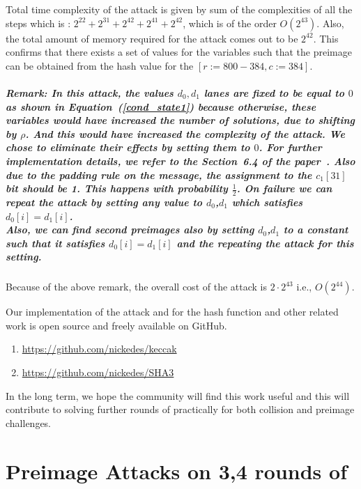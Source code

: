 Total time complexity of the attack is given by sum of the complexities of all the steps which is : $2^{22} + 2^{31} + 2^{42} + 2^{41} + 2^{42}$, which is of the order $O(2^{43})$.
Also, the total amount of memory required for the attack comes out to be $2^{42}$. 
This confirms that there exists a set of values for the variables such that the preimage can be obtained from the hash value for the \KECCAK{}$[r:=800-384, c:=384]$.


\paragraph{Remark:
In this attack, the values $d_0, d_1$ lanes are fixed to be equal to $0$ as shown in Equation~(\ref{cond_state1}) because otherwise, these variables would have increased the number of solutions, due to shifting by $\rho$. 
And this would have increased the complexity of the attack. We chose to eliminate their effects by setting them to $0$. For further implementation details, we refer to the Section~6.4 of the paper~\cite{naya2011practical}. Also due to the padding rule on the message, the assignment to the $c_1[31]$ bit should be 1. This happens with probability $\tfrac{1}{2}$. On failure we can repeat the attack by setting any value to $d_0$,$d_1$ which satisfies $d_0[i]=d_1[i]$. \\
Also, we can find second preimages also by setting $d_0$,$d_1$ to a constant such that it satisfies $d_0[i]=d_1[i]$ and the repeating the attack for this setting.
}

Because of the above remark, the overall cost of the attack is $2\cdot 2^{43}$ i.e., $O(2^{44})$.

Our implementation of the attack and for the hash function and other related work is open source and freely available on GitHub.

\begin{enumerate}
    \item \url{https://github.com/nickedes/keccak}
    \item \url{https://github.com/nickedes/SHA3}
\end{enumerate}

In the long term, we hope the community will find this work useful and this will contribute to solving further rounds of \KECCAK{} practically for both collision and preimage challenges.

\chapter{Preimage Attacks on 3,4 rounds of \KECCAK{}}

